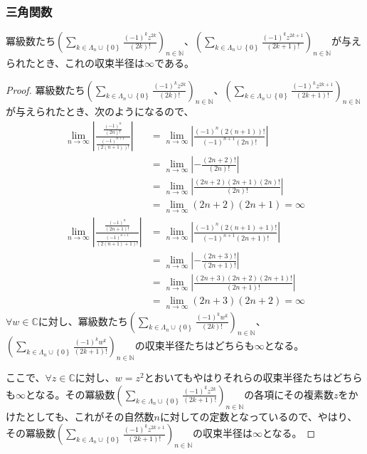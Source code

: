 \documentclass[dvipdfmx]{jsarticle}
\begin{document}
\subsubsection{三角関数}%
\begin{thm}\label{4.3.1.10}
冪級数たち$\left( \sum_{k \in \varLambda_{n} \cup \left\{ 0 \right\}} \frac{( - 1)^{k}z^{2k}}{(2k)!} \right)_{n \in \mathbb{N}}$、$\left( \sum_{k \in \varLambda_{n} \cup \left\{ 0 \right\}} \frac{( - 1)^{k}z^{2k + 1}}{(2k + 1)!} \right)_{n \in \mathbb{N}}$が与えられたとき、これの収束半径は$\infty$である。
\end{thm}
\begin{proof}
冪級数たち$\left( \sum_{k \in \varLambda_{n} \cup \left\{ 0 \right\}} \frac{( - 1)^{k}z^{2k}}{(2k)!} \right)_{n \in \mathbb{N}}$、$\left( \sum_{k \in \varLambda_{n} \cup \left\{ 0 \right\}} \frac{( - 1)^{k}z^{2k + 1}}{(2k + 1)!} \right)_{n \in \mathbb{N}}$が与えられたとき、次のようになるので、
\begin{align*}
\lim_{n \rightarrow \infty}\left| \frac{\frac{( - 1)^{n}}{(2n)!}}{\frac{( - 1)^{n + 1}}{\left( 2(n + 1) \right)!}} \right| &= \lim_{n \rightarrow \infty}\left| \frac{( - 1)^{n}\left( 2(n + 1) \right)!}{( - 1)^{n + 1}(2n)!} \right|\\
&= \lim_{n \rightarrow \infty}\left| - \frac{(2n + 2)!}{(2n)!} \right|\\
&= \lim_{n \rightarrow \infty}\left| \frac{(2n + 2)(2n + 1)(2n)!}{(2n)!} \right|\\
&= \lim_{n \rightarrow \infty}{(2n + 2)(2n + 1)} = \infty\\
\lim_{n \rightarrow \infty}\left| \frac{\frac{( - 1)^{n}}{(2n + 1)!}}{\frac{( - 1)^{n + 1}}{\left( 2(n + 1) + 1 \right)!}} \right| &= \lim_{n \rightarrow \infty}\left| \frac{( - 1)^{n}\left( 2(n + 1) + 1 \right)!}{( - 1)^{n + 1}(2n + 1)!} \right|\\
&= \lim_{n \rightarrow \infty}\left| - \frac{(2n + 3)!}{(2n + 1)!} \right|\\
&= \lim_{n \rightarrow \infty}\left| \frac{(2n + 3)(2n + 2)(2n + 1)!}{(2n + 1)!} \right|\\
&= \lim_{n \rightarrow \infty}{(2n + 3)(2n + 2)} = \infty
\end{align*}
$\forall w \in \mathbb{C}$に対し、冪級数たち$\left( \sum_{k \in \varLambda_{n} \cup \left\{ 0 \right\}} \frac{( - 1)^{k}w^{k}}{(2k)!} \right)_{n \in \mathbb{N}}$、$\left( \sum_{k \in \varLambda_{n} \cup \left\{ 0 \right\}} \frac{( - 1)^{k}w^{k}}{(2k + 1)!} \right)_{n \in \mathbb{N}}$の収束半径たちはどちらも$\infty$となる。\par
ここで、$\forall z \in \mathbb{C}$に対し、$w = z^{2}$とおいてもやはりそれらの収束半径たちはどちらも$\infty$となる。その冪級数$\left( \sum_{k \in \varLambda_{n} \cup \left\{ 0 \right\}} \frac{( - 1)^{k}z^{2k}}{(2k + 1)!} \right)_{n \in \mathbb{N}}$の各項にその複素数$z$をかけたとしても、これがその自然数$n$に対しての定数となっているので、やはり、その冪級数$\left( \sum_{k \in \varLambda_{n} \cup \left\{ 0 \right\}} \frac{( - 1)^{k}z^{2k + 1}}{(2k + 1)!} \right)_{n \in \mathbb{N}}$の収束半径は$\infty$となる。
\end{proof}
\end{document}
